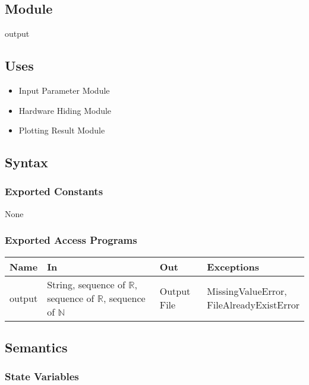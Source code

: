 \documentclass[12pt, titlepage]{article}
\begin{document}
\subsection{Module}
output

\subsection{Uses}
\begin{itemize}
    \item Input Parameter Module 
    \item Hardware Hiding Module    
    \item Plotting Result Module
\end{itemize}

\subsection{Syntax}

\subsubsection{Exported Constants}
None 
\subsubsection{Exported Access Programs}


\begin{tabular}{p{2cm} p{5.5cm} p{3cm} p{3.5cm}}
\hline
\textbf{Name} & \textbf{In} & \textbf{Out} & \textbf{Exceptions} \\
\hline
output & \makecell[l]{String, \\ sequence of $\mathbb{R}$, \\ sequence of $\mathbb{R}$, \\ sequence of $\mathbb{N}$ } & Output File & \makecell[l]{MissingValueError, \\ FileAlreadyExistError} \\
\hline
\end{tabular}

\subsection{Semantics}

\subsubsection{State Variables}
\end{document}
